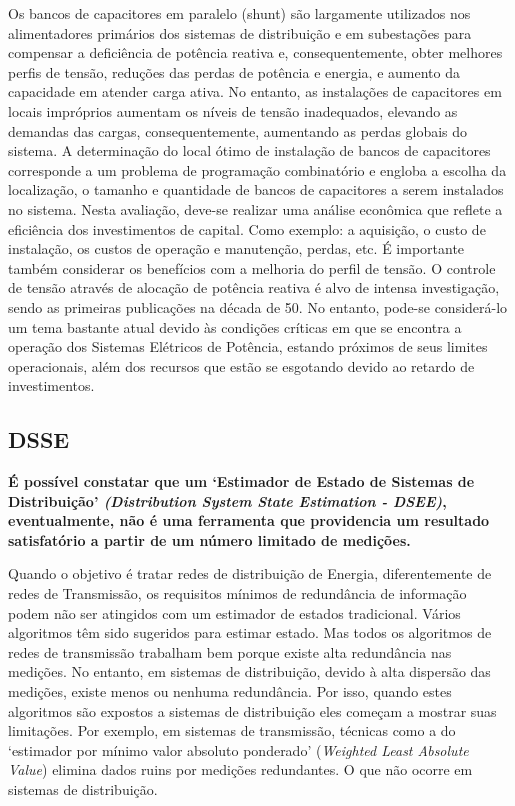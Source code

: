 \documentclass{IEEEtran}
\begin{document}
Os bancos de capacitores em paralelo (shunt) são largamente utilizados nos alimentadores primários dos sistemas de distribuição e em subestações para compensar a deficiência de potência reativa e, consequentemente, obter melhores perfis de tensão, reduções das perdas de potência e energia, e aumento da capacidade em atender carga ativa. No entanto, as instalações de capacitores em locais impróprios aumentam os níveis de tensão inadequados, elevando as demandas das cargas, consequentemente, aumentando as perdas globais do sistema.
A determinação do local ótimo de instalação de bancos de capacitores corresponde a um problema de programação combinatório e engloba a escolha da localização, o tamanho e quantidade de bancos de capacitores a serem instalados no sistema. Nesta avaliação, deve-se realizar uma análise econômica que reflete a eficiência dos investimentos de capital. Como exemplo: a aquisição, o custo de instalação, os custos de operação e manutenção, perdas, etc. É importante também considerar os benefícios com a melhoria do perfil de tensão.
O controle de tensão através de alocação de potência reativa é alvo de intensa investigação, sendo as primeiras publicações na década de 50. No entanto, pode-se considerá-lo um tema bastante atual devido às condições críticas em que se encontra a operação dos Sistemas Elétricos de Potência, estando próximos de seus limites operacionais, além dos recursos que estão se esgotando devido ao retardo de investimentos.

\subsection{DSSE}
\textbf{É possível constatar que um `Estimador de Estado de Sistemas de Distribuição' \textit{(Distribution System State Estimation - DSEE)}, eventualmente, não é uma ferramenta que providencia um resultado satisfatório a partir de um número limitado de medições.}

Quando o objetivo é tratar redes de distribuição de Energia, diferentemente de redes de Transmissão, os requisitos mínimos de redundância de informação podem não ser atingidos com um estimador de estados tradicional. Vários algoritmos têm sido sugeridos para estimar estado. Mas todos os algoritmos de redes de transmissão trabalham bem porque existe alta redundância nas medições. No entanto, em sistemas de distribuição, devido à alta dispersão das medições, existe menos ou nenhuma redundância. Por isso, quando estes algoritmos são expostos a sistemas de distribuição eles começam a mostrar suas limitações. Por exemplo, em sistemas de transmissão, técnicas como a do `estimador por mínimo valor absoluto ponderado' (\textit{Weighted Least Absolute Value}) elimina dados ruins por medições redundantes. O que não ocorre em sistemas de distribuição.
\end{document}
